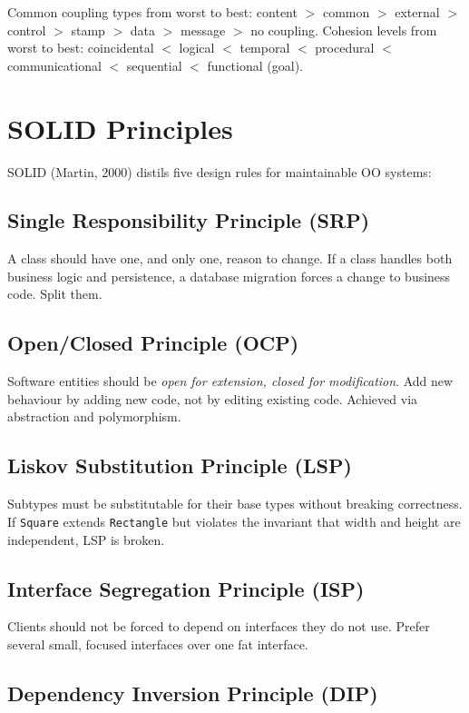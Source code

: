 Common coupling types from worst to best: content $>$ common $>$ external $>$ control $>$ stamp $>$ data $>$ message $>$ no coupling. Cohesion levels from worst to best: coincidental $<$ logical $<$ temporal $<$ procedural $<$ communicational $<$ sequential $<$ functional (goal).

\section{SOLID Principles}

SOLID (Martin, 2000) distils five design rules for maintainable OO systems:

\subsection{Single Responsibility Principle (SRP)}

A class should have one, and only one, reason to change. If a class handles both business logic and persistence, a database migration forces a change to business code. Split them.

\subsection{Open/Closed Principle (OCP)}

Software entities should be \emph{open for extension, closed for modification}. Add new behaviour by adding new code, not by editing existing code. Achieved via abstraction and polymorphism.

\subsection{Liskov Substitution Principle (LSP)}

Subtypes must be substitutable for their base types without breaking correctness. If \texttt{Square} extends \texttt{Rectangle} but violates the invariant that width and height are independent, LSP is broken.

\subsection{Interface Segregation Principle (ISP)}

Clients should not be forced to depend on interfaces they do not use. Prefer several small, focused interfaces over one fat interface.

\subsection{Dependency Inversion Principle (DIP)}

